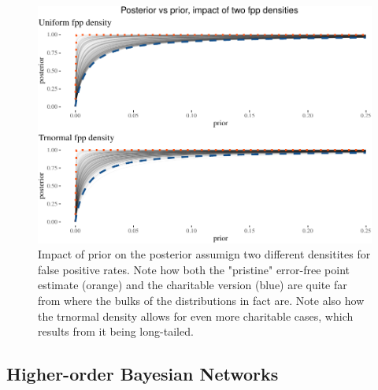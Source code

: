 \documentclass[
  10pt,
  dvipsnames,enabledeprecatedfontcommands]{scrartcl}
\begin{document}
\begin{figure}[H]

\begin{center}\includegraphics[width=0.8\linewidth]{paper-outline_files/figure-latex/fig:fplinesPlot3-1} \end{center}
\caption{Impact of prior on the posterior assumign two different densitites for false positive rates. Note how both the "pristine" error-free point estimate (orange) and the charitable version (blue) are quite far from where the bulks of the distributions in fact are. Note also how the trnormal density allows for even more charitable cases, which results from it being long-tailed.}
\label{fig:fplinesPlot}
\end{figure}

\hypertarget{higher-order-bayesian-networks}{%
\subsection{Higher-order Bayesian
Networks}\label{higher-order-bayesian-networks}}
\end{document}
